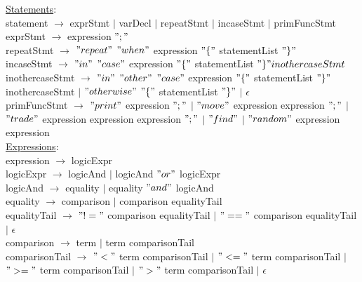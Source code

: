 \documentclass{article}
\begin{document}
\underline{Statements}: \\

statement $\rightarrow$ exprStmt $\vert$ varDecl $\vert$ repeatStmt $\vert$ incaseStmt $\vert$ primFuncStmt \\

exprStmt $\rightarrow$ expression $";"$ \\

repeatStmt $\rightarrow$ $"repeat"$  $"when"$  expression $"\{"$ statementList  $"\}"$ \\

incaseStmt $\rightarrow$  $"in"$  $"case"$ expression $"\{"$ statementList  $"\}" inothercaseStmt$\\

inothercaseStmt $\rightarrow$  $"in"$ $"other"$  $"case"$ expression $"\{"$ statementList  $"\}"$ inothercaseStmt $\vert$ $"otherwise"$ $"\{"$ statementList  $"\}"$ $\vert$ $\epsilon$ \\  

primFuncStmt $\rightarrow$ $"print"$ expression $";"$  $\vert$ $"move"$ expression expression $";"$ $\vert$ $"trade"$ expression expression expression $";"$ $\vert$ $"find"$ $\vert$ $"random"$ expression expression \\

\underline{Expressions}: \\

expression $\rightarrow$ logicExpr \\

logicExpr $\rightarrow$ logicAnd  $\vert$ logicAnd $"or"$ logicExpr \\

logicAnd $\rightarrow$ equality $\vert$ equality $"and"$ logicAnd \\

equality $\rightarrow$ comparison $\vert$ comparison equalityTail \\

equalityTail $\rightarrow$ $"!="$ comparison equalityTail $\vert$ $"=="$ comparison equalityTail $\vert$ $\epsilon$ \\

comparison $\rightarrow$ term $\vert$ term comparisonTail \\

comparisonTail $\rightarrow$ $"<"$ term comparisonTail $\vert$ $"<="$ term comparisonTail $\vert$ $">="$ term comparisonTail $\vert$ $">"$ term comparisonTail $\vert$ $\epsilon$ \\
\end{document}
